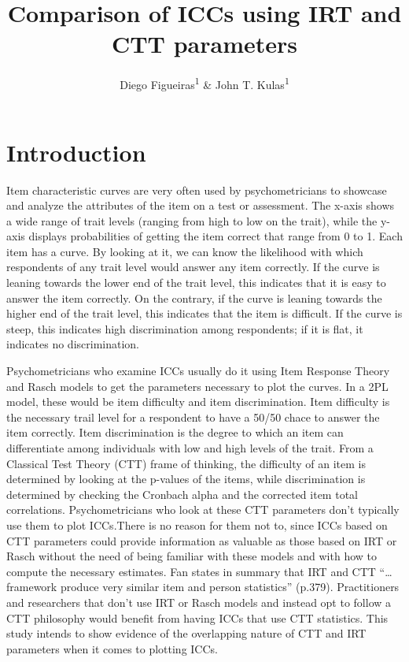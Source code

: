 \documentclass[
  english,
  man]{apa6}
\title{Comparison of ICCs using IRT and CTT parameters}
\author{Diego Figueiras\textsuperscript{1} \& John T. Kulas\textsuperscript{1}}
\date{}
\affiliation{\vspace{0.5cm}\textsuperscript{1} Montclair State University}
\begin{document}
\maketitle

\hypertarget{introduction}{%
\section{Introduction}\label{introduction}}

Item characteristic curves are very often used by psychometricians to showcase and analyze the attributes of the item on a test or assessment. The x-axis shows a wide range of trait levels (ranging from high to low on the trait), while the y-axis displays probabilities of getting the item correct that range from 0 to 1. Each item has a curve. By looking at it, we can know the likelihood with which respondents of any trait level would answer any item correctly. If the curve is leaning towards the lower end of the trait level, this indicates that it is easy to answer the item correctly. On the contrary, if the curve is leaning towards the higher end of the trait level, this indicates that the item is difficult. If the curve is steep, this indicates high discrimination among respondents; if it is flat, it indicates no discrimination.

Psychometricians who examine ICCs usually do it using Item Response Theory and Rasch models to get the parameters necessary to plot the curves. In a 2PL model, these would be item difficulty and item discrimination. Item difficulty is the necessary trail level for a respondent to have a 50/50 chace to answer the item correctly. Item discrimination is the degree to which an item can differentiate among individuals with low and high levels of the trait. From a Classical Test Theory (CTT) frame of thinking, the difficulty of an item is determined by looking at the p-values of the items, while discrimination is determined by checking the Cronbach alpha and the corrected item total correlations. Psychometricians who look at these CTT parameters don't typically use them to plot ICCs.There is no reason for them not to, since ICCs based on CTT parameters could provide information as valuable as those based on IRT or Rasch without the need of being familiar with these models and with how to compute the necessary estimates. Fan states in summary that IRT and CTT \enquote{\ldots{} framework produce very similar item and person statistics} (p.379). Practitioners and researchers that don't use IRT or Rasch models and instead opt to follow a CTT philosophy would benefit from having ICCs that use CTT statistics. This study intends to show evidence of the overlapping nature of CTT and IRT parameters when it comes to plotting ICCs.
\end{document}
